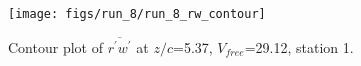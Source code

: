 \begin{figure}[H]
\centering
\texttt{[image: figs/run\_8/run\_8\_rw\_contour]}
\caption{Contour plot of $\overline{r^\prime w^\prime}$ at $z/c$=5.37, $V_{free}$=29.12, station 1.}
\label{fig:run_8_rw_contour}
\end{figure}



